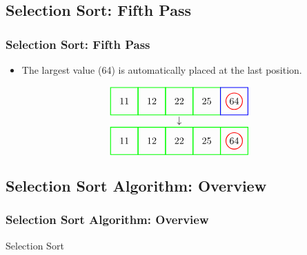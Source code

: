 \documentclass{beamer}
\begin{document}
\subsection{Selection Sort: Fifth Pass}
\begin{frame}[c, fragile]
\frametitle{Selection Sort: Fifth Pass}

\begin{itemize}
    \item The largest value (64) is automatically placed at the last position.
\end{itemize}

\[
\begin{array}{c}
\begin{tikzpicture}[baseline=(current bounding box.center)]
    \node at (0,0) {11};
    \node at (1,0) {12};
    \node at (2,0) {22};
    \node at (3,0) {25};
    \node at (4,0) {64};
    \draw[red, thick] (4,0) circle (0.3);
    \draw[green, thick] (-0.5,-0.5) rectangle (0.5,0.5);
    \draw[green, thick] (0.5,-0.5) rectangle (1.5,0.5);
    \draw[green, thick] (1.5,-0.5) rectangle (2.5,0.5);
    \draw[green, thick] (2.5,-0.5) rectangle (3.5,0.5);
    \draw[blue, thick] (3.5,-0.5) rectangle (4.5,0.5);
\end{tikzpicture} \\
\downarrow \\
\begin{tikzpicture}[baseline=(current bounding box.center)]
    \node at (0,0) {11};
    \node at (1,0) {12};
    \node at (2,0) {22};
    \node at (3,0) {25};
    \node at (4,0) {64};
    \draw[red, thick] (4,0) circle (0.3);
    \draw[green, thick] (-0.5,-0.5) rectangle (0.5,0.5);
    \draw[green, thick] (0.5,-0.5) rectangle (1.5,0.5);
    \draw[green, thick] (1.5,-0.5) rectangle (2.5,0.5);
    \draw[green, thick] (2.5,-0.5) rectangle (3.5,0.5);
    \draw[green, thick] (3.5,-0.5) rectangle (4.5,0.5);
\end{tikzpicture}
\end{array}
\]

\end{frame}

\subsection{Selection Sort Algorithm: Overview}
\begin{frame}[fragile]
\frametitle{Selection Sort Algorithm: Overview}

\hspace*{1cm} 
\begin{algorithm}[H]
\caption{Selection Sort}
\label{algo:selectionsort}

\end{algorithm}

\end{frame}
\end{document}

